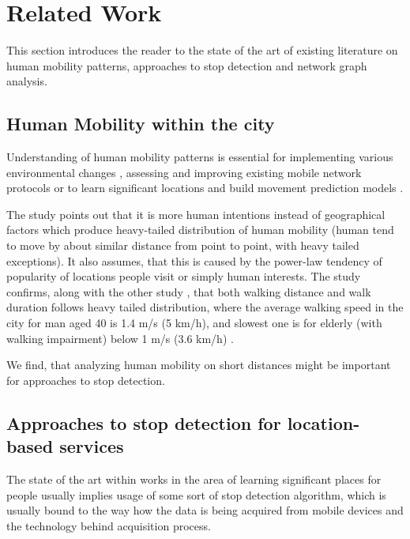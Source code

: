 \chapter{Related Work}
\label{cha:relatedwork}

This section introduces the reader to the state of the art of existing literature on human mobility patterns, approaches to stop detection and network graph analysis.

\section{Human Mobility within the city}
\label{cha:introduction_hummob}

Understanding of human mobility patterns is essential for implementing various environmental changes \cite{HumanMobility2}, assessing and improving existing mobile network protocols \cite{HumanMobility1} or to learn significant locations and build movement prediction models \cite{StopDet1}. 

The study \cite{HumanMobility1} points out that it is more human intentions instead of geographical factors which produce heavy-tailed distribution of human mobility (human tend to move by about similar distance from point to point, with heavy tailed exceptions). It also assumes, that this is caused by the power-law tendency of popularity of locations people visit or simply human interests. The study confirms, along with the other study \cite{HumanMobility2}, that both walking distance and walk duration follows heavy tailed distribution, where the average walking speed in the city for man aged 40 is 1.4 m/s (5 km/h), and slowest one is for elderly (with walking impairment) below 1 m/s (3.6 km/h) \cite{HumanMobility3}. 

We find, that analyzing human mobility on short distances might be important for approaches to stop detection. 

\section{Approaches to stop detection for location-based services}
\label{cha:introduction_appr_stopdet}

The state of the art within works in the area of learning significant places for people usually implies usage of some sort of stop detection algorithm, which is usually bound to the way how the data is being acquired from mobile devices and the technology behind acquisition process. 

